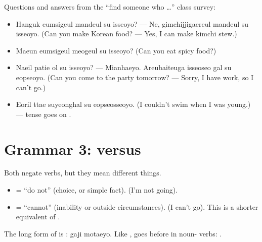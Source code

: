 \begin{example}[Abilities]
Questions and answers from the ``find someone who \ldots'' class survey:
\begin{itemize}
  \item {} Hanguk
        eumsigeul mandeul su isseoyo? --- Ne, gimchijjigaereul mandeul su isseoyo. (Can
        you make Korean food? --- Yes, I can make kimchi stew.)
  \item {} Maeun eumsigeul meogeul su isseoyo? (Can you eat
        spicy food?)
  \item {}
        Naeil patie ol su isseoyo? --- Mianhaeyo. Areubaiteuga isseoseo gal su eopseoyo.
        (Can you come to the party tomorrow? --- Sorry, I have work, so I can't go.)
  \item {} Eoril ttae suyeonghal su eopseosseoyo. (I
        couldn't swim when I was young.) --- tense goes on .
\end{itemize}
\end{example}

\section{Grammar 3:  versus }

Both negate verbs, but they mean different things.
\begin{itemize}
  \item {} = ``do not'' (choice, or simple fact).  (I'm not going).
  \item {} = ``cannot'' (inability or outside circumstances).  (I can't
        go). This is a shorter equivalent of .
\end{itemize}
The long form of  is :  gaji motaeyo. Like
,  goes before  in noun- verbs: .

\begin{center}
\end{center}

